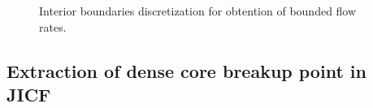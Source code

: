 \clearpage

\begin{figure}[ht]
     \centering
     \caption{Interior boundaries discretization for obtention of bounded flow rates.}
      \label{fig:jicf_IBs_sketch_discretization}
\end{figure}



%

\subsection{Extraction of dense core breakup point in JICF}
\label{subsec:ch5_jet_dense_core_extraction}

